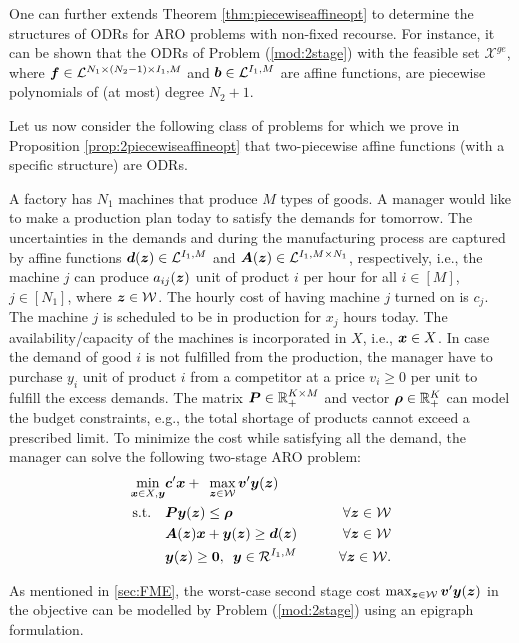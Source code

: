 \documentclass[fleqn,orsc,blindrev]{informs4}
\newcommand{\mb}[1]{\mbox{\boldmath \ensuremath{#1}}}
\begin{document}
\iffalse

 {  One can further extends Theorem \ref{thm:piecewiseaffineopt} to determine the structures of ODRs for ARO problems with non-fixed recourse.  For instance, it can be shown that the ODRs of Problem (\ref{mod:2stage}) with the feasible set $\mathcal{X}^{ge}$, where $\mb{f} \in \mathcal{L}^{N_1 \times (N_2-1) \times I_1, M}$ and  $\mb{b} \in \mathcal{L}^{I_1,M}$ are affine functions, are piecewise polynomials of (at most) degree $N_2+1$. } 


Let us now consider the following class of problems for which we prove in Proposition \ref{prop:2piecewiseaffineopt} that two-piecewise affine functions (with a specific structure) are ODRs.

	\begin{example} 
		A factory has $N_1$ machines that produce $M$ types of goods. A manager would like to make a production plan today to satisfy the demands for tomorrow. The uncertainties in the demands and during the manufacturing process are captured by affine functions $\mb{d}(\mb{z}) \in \mathcal{L}^{I_1,M}$ and $\mb{A}(\mb{z}) \in \mathcal{L}^{I_1, M\times N_1}$, respectively, i.e., the machine $j$ can produce $a_{ij}(\mb{z})$ unit of product $i$ per hour for all $i\in [M]$, $j\in [N_1]$, where $\mb{z} \in \mathcal{W}$. The hourly cost of having machine $j$ turned on is $c_j$. The machine $j$ is scheduled to be in production for $x_j$ hours today. The availability/capacity of the machines is incorporated in $X$, i.e., $\mb{x}\in X$.  In case the demand of good $i$ is not fulfilled from the production, the manager have to purchase $y_i$ unit of product $i$ from a competitor at a price $v_{i} \ge 0$ per unit to fulfill the excess demands. The  matrix $\mb{P} \in \mathbb{R}^{K\times M}_+$ and  vector $\mb{\rho}\in \mathbb{R}^{K}_+$ can model the budget constraints, e.g., the total shortage of products cannot exceed a prescribed limit. To minimize the cost while satisfying all the demand, the manager can solve the following two-stage ARO problem:
\begin{equation}\label{p:production}
			\begin{aligned} 
				\min_{ \boldsymbol{x} \in X,  \boldsymbol{y}}  &  \mb{c}'\mb{x} +  \enskip \max_{ \boldsymbol{z} \in \mathcal{W}} \mb{v}'\mb{y}(\mb{z}) \\
				{\rm s.t.} \quad  &   \mb{P}\mb{y}(\mb{z}) \le \mb{\rho} \qquad & \forall \mb{z} \in \mathcal{W} \\
				& \mb{A}(\mb{z})\mb{x} + \mb{y}(\mb{z}) \ge \mb{d}(\mb{z}) \qquad & \forall \mb{z} \in \mathcal{W} \\
				& \mb{y}(\mb{z}) \ge \mb{0}, \,\,\,  \mb{y} \in \mathcal{R}^{I_1,M} & \forall \mb{z} \in \mathcal{W}. 
			\end{aligned}
\end{equation}
		 \hfill \Halmos
		
        As mentioned in \textsection \ref{sec:FME}, the worst-case second stage cost $ \max_{ \boldsymbol{z} \in \mathcal{W} } \mb{v}'\mb{y}(\mb{z})$ in the objective can be modelled by Problem (\ref{mod:2stage}) using an epigraph formulation. 
	\end{example} 
	
\end{document}
